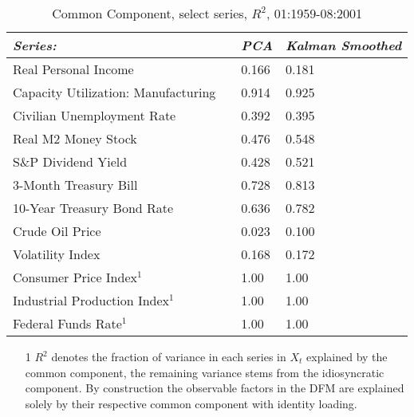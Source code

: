 \begin{table}[H]
    \centering
    \caption{Common Component, select series, $R^2$, 01:1959-08:2001}
\begin{tabular}{llll}
\toprule
\textit{Series:} && \textit{PCA} & \textit{Kalman Smoothed} \\
\midrule
Real Personal Income && 0.166 & 0.181 \\
Capacity Utilization: Manufacturing && 0.914 & 0.925 \\
Civilian Unemployment Rate && 0.392 & 0.395 \\
Real M2 Money Stock && 0.476 & 0.548 \\
S\&P Dividend Yield && 0.428 & 0.521 \\
3-Month Treasury Bill && 0.728 & 0.813 \\
10-Year Treasury Bond Rate && 0.636 & 0.782 \\
Crude Oil Price && 0.023 & 0.100 \\
Volatility Index && 0.168 & 0.172 \\
Consumer Price Index$^1$ && 1.00 & 1.00 \\
Industrial Production Index$^1$ && 1.00 & 1.00 \\
Federal Funds Rate$^1$ && 1.00 & 1.00 \\
\bottomrule
\end{tabular}
\begin{minipage}{0.88\textwidth}
{\footnotesize
    \begin{enumerate}
        \item[] {}
        \item[1] $R^2$ denotes the fraction of variance in each series in $X_t$ explained by the common component, the remaining variance stems from the idiosyncratic component. By construction the observable factors in the DFM are explained solely by their respective common component with identity loading.
    \end{enumerate}}
    \end{minipage}
    \label{tab:R2sBernanke}
\end{table}
